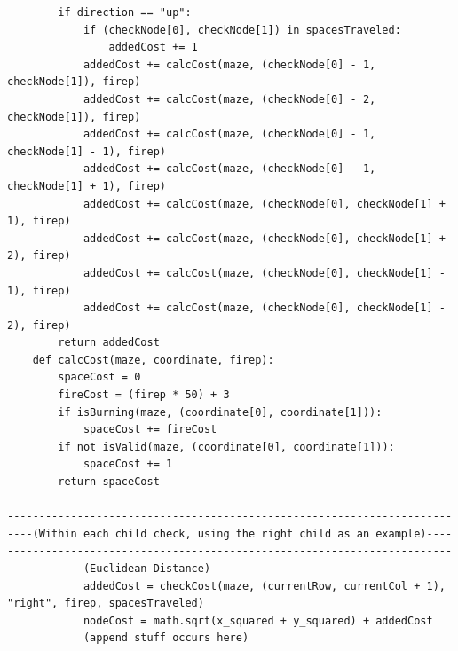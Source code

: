 \documentclass[11pt]{article}
\begin{document}
\begin{verbatim}
        if direction == "up":
            if (checkNode[0], checkNode[1]) in spacesTraveled:
                addedCost += 1
            addedCost += calcCost(maze, (checkNode[0] - 1, checkNode[1]), firep)
            addedCost += calcCost(maze, (checkNode[0] - 2, checkNode[1]), firep)
            addedCost += calcCost(maze, (checkNode[0] - 1, checkNode[1] - 1), firep)
            addedCost += calcCost(maze, (checkNode[0] - 1, checkNode[1] + 1), firep)
            addedCost += calcCost(maze, (checkNode[0], checkNode[1] + 1), firep)
            addedCost += calcCost(maze, (checkNode[0], checkNode[1] + 2), firep)
            addedCost += calcCost(maze, (checkNode[0], checkNode[1] - 1), firep)
            addedCost += calcCost(maze, (checkNode[0], checkNode[1] - 2), firep)
        return addedCost
    def calcCost(maze, coordinate, firep):
        spaceCost = 0
        fireCost = (firep * 50) + 3
        if isBurning(maze, (coordinate[0], coordinate[1])):
            spaceCost += fireCost
        if not isValid(maze, (coordinate[0], coordinate[1])):
            spaceCost += 1
        return spaceCost
        
----------------------------------------------------------------------
----(Within each child check, using the right child as an example)----
----------------------------------------------------------------------
			(Euclidean Distance)
            addedCost = checkCost(maze, (currentRow, currentCol + 1), "right", firep, spacesTraveled)
            nodeCost = math.sqrt(x_squared + y_squared) + addedCost
			(append stuff occurs here)
\end{verbatim}
\end{document}
